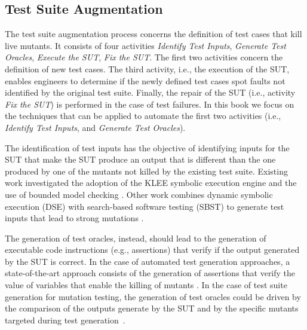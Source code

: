 
\subsection{Test Suite Augmentation} %
\label{sub:test_suite_augmentation}

The test suite augmentation process concerns the definition of test cases that kill live mutants.
It consists of four activities \emph{Identify Test Inputs}, \emph{Generate Test Oracles}, \emph{Execute the SUT}, \emph{Fix the SUT}. The first two activities concern the definition of new test cases.
The third activity, i.e., the execution of the SUT, enables engineers to determine if the newly defined test cases spot faults not identified by the original test suite. 
Finally, the repair of the SUT (i.e., activity \emph{Fix the SUT}) is performed in the case of test failures.
In this book we focus on the techniques that can be applied to automate the first two activities (i.e., \emph{Identify Test Inputs}, and \emph{Generate Test Oracles}).
 
The identification of test inputs has the objective of identifying inputs for the SUT that make the SUT produce an output that is different than the one produced by one of the mutants not killed by the existing test suite.
Existing work investigated the adoption of the KLEE symbolic execution engine \cite{holling2016nequivack} and the use of bounded model checking \cite{riener2011test}. Other work combines dynamic symbolic execution (DSE) with search-based software testing (SBST) to generate test inputs that lead to strong mutations \cite{harman2011strong}. 

The generation of test oracles, instead, should lead to the generation of executable code instructions (e.g., assertions) that verify if the output generated by the SUT is correct.
In the case of automated test generation approaches, a state-of-the-art approach consists of the generation of assertions that verify the value of variables that enable the killing of mutants \cite{fraser2011mutation}. 
In the case of test suite generation for mutation testing, the generation of test oracles could be driven by the comparison of the outputs generate by the SUT and by the specific mutants targeted during test generation~\cite{Staats2012}.

